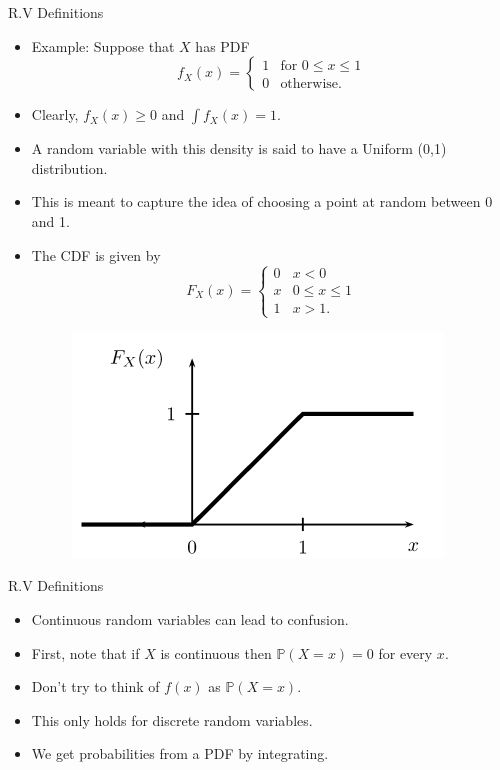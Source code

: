 \documentclass[handout]{beamer}
\begin{document}
\begin{frame}{R.V Definitions}
\scriptsize{
\begin{itemize}
 \item Example: Suppose that $X$ has PDF
 \[   
f_X(x) = 
     \begin{cases}
     1 & \text{for }0\leq x \leq 1 \\
     0 &  \text{otherwise.}
     \end{cases}
\]
 
\item Clearly, $f_X(x) \geq 0$ and $\int f_X(x) = 1$. 
\item A random variable with this density is said to have a Uniform (0,1) distribution.
\item This is meant to capture the idea of choosing a point at random between 0 and 1. 
\item The CDF is given by 
 \[   
F_X(x) = 
     \begin{cases}
     0 & x<0 \\
     x &  0\leq x \leq 1 \\
     1 &  x>1. 
     \end{cases}
\] 
 
\begin{figure}[h!]
	\centering
	\includegraphics[scale=0.4]{pics/cdf_uniform.png}
\end{figure} 
 
\end{itemize}




}
\end{frame}


\begin{frame}{R.V Definitions}
\scriptsize{
\begin{itemize}
 \item Continuous random variables can lead to confusion. 
 \item First, note that if $X$ is continuous then $\mathbb{P}(X = x) = 0$ for every $x$. 
\item Don't try to think of $f(x)$ as $\mathbb{P}(X = x)$. 
\item This only holds for discrete random variables. 
\item We get probabilities from a PDF by integrating. 

\end{itemize}




}
\end{frame}
\end{document}
